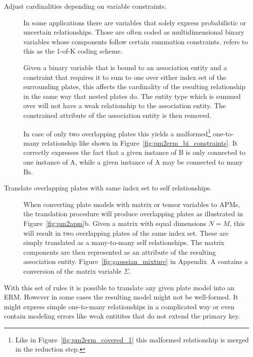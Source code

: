 \begin{description}
\item[Adjust cardinalities depending on variable constraints.] In some applications there are variables that solely express probabilistic or uncertain relationships. Those are often coded as multidimensional binary variables whose components follow certain summation constraints. \textcite{bishop2006pattern} refers to this as the 1-of-K coding scheme.

Given a binary variable that is bound to an association entity and a constraint that requires it to sum to one over either index set of the surrounding plates, this affects the cardinality of the resulting relationship in the same way that nested plates do. The entity type which is summed over will not have a weak relationship to the association entity. The constrained attribute of the association entity is then removed.

In case of only two overlapping plates this yields a malformed\footnote{Like in Figure~\ref{fig:pm2erm_covered_1} this malformed relationship is merged in the reduction step.} one-to-many relationship like shown in Figure~\ref{fig:pm2erm_bi_constraints}. It correctly expresses the fact that a given instance of B is only connected to one instance of A, while a given instance of A may be connected to many Bs.

\item[Translate overlapping plates with same index set to self relationships.] When converting plate models with matrix or tensor variables to APMs, the translation procedure will produce overlapping plates as illustrated in Figure~\ref{fig:pm2apm}b. Given a matrix with equal dimensions $N = M$, this will result in two overlapping plates of the same index set. These are simply translated as a many-to-many self relationships. The matrix components are then represented as an attribute of the resulting association entity. Figure~\ref{fig:gaussian_mixture} in Appendix~A contains a conversion of the matrix variable $\Sigma$.
\end{description}

With this set of rules it is possible to translate any given plate model into an ERM. However in some cases the resulting model might not be well-formed. It might express simple one-to-many relationships in a complicated way or even contain modeling errors like weak entitites that do not extend the primary key.

